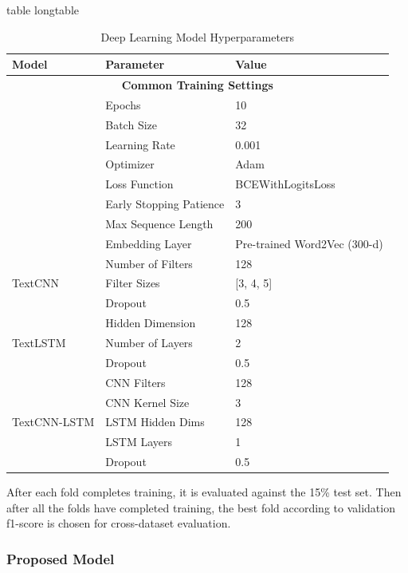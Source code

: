 \documentclass[stu,12pt,floatsintext,donotrepeattitle]{apa7}
\makeatletter
\let\origcaption\caption
\newcommand{\@tabletype}{table}
\newcommand{\@longtabletype}{longtable}
\DeclareRobustCommand{\caption}[2][]{%
    \ifx\relax#1\relax
      \origcaption{#2}%
      \def\temp@cap{#2}%
    \else
      \origcaption[#1]{#2}%
      \def\temp@cap{#1}%
    \fi
    \ifx\@captype\@tabletype
      \ifx\@currenvir\@longtabletype\else
        \addcontentsline{lot}{table}{\protect\numberline{\thetable}{\ignorespaces\temp@cap}}%
      \fi
    \fi
  }%
\let\oldcaption\caption
\renewcommand{\caption}[2][]{%
    \oldcaption[#1]{#2}%
    \vspace{-12pt}%
  }%
\makeatother
\begin{document}
\begin{table}[ht]
    \centering
    \caption{Deep Learning Model Hyperparameters}
    \label{tab:dl_model_params}
    \begin{tabular}{l l l}
        \hline
        \textbf{Model} & \textbf{Parameter} & \textbf{Value} \\
        \hline
        \multicolumn{3}{c}{\textbf{Common Training Settings}} \\
        & Epochs & 10 \\
        & Batch Size & 32 \\
        & Learning Rate & 0.001 \\
        & Optimizer & Adam \\
        & Loss Function & BCEWithLogitsLoss \\
        & Early Stopping Patience & 3 \\
        & Max Sequence Length & 200 \\
        & Embedding Layer & Pre-trained Word2Vec (300-d) \\
        \hline
        \multirow{3}{*}{TextCNN} & Number of Filters & 128 \\
        & Filter Sizes & [3, 4, 5] \\
        & Dropout & 0.5 \\
        \hline
        \multirow{3}{*}{TextLSTM} & Hidden Dimension & 128 \\
        & Number of Layers & 2 \\
        & Dropout & 0.5 \\
        \hline
        \multirow{5}{*}{TextCNN-LSTM} & CNN Filters & 128 \\
        & CNN Kernel Size & 3 \\
        & LSTM Hidden Dims & 128 \\
        & LSTM Layers & 1 \\
        & Dropout & 0.5 \\
        \hline
    \end{tabular}
\end{table}

After each fold completes training, it is evaluated against the 15\% test set. Then after all the folds have completed training, the best fold according to validation f1-score is chosen for cross-dataset evaluation. 


\subsubsection{Proposed Model}
\end{document}

